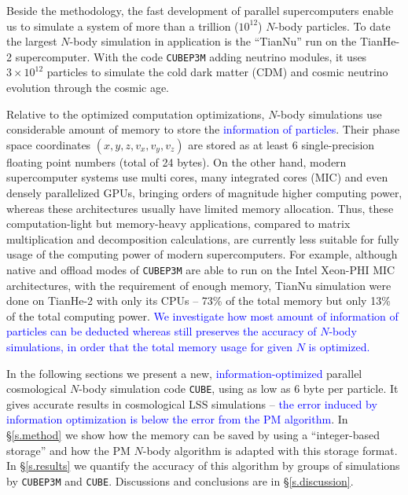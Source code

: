 \documentclass[10pt,twocolumn,preprint]{emulateapj}
\newcommand{\tcb}{\textcolor{blue}}
\begin{document}
Beside the methodology, the fast development of parallel supercomputers enable us to simulate a system of more than a trillion ($10^{12}$) $N$-body particles. To date the largest $N$-body simulation in application is the ``TianNu'' \citep{2017NatAs...1E.143Y,2017RAA....17...85E} run on the TianHe-2 supercomputer. With the code {\tt CUBEP3M} adding neutrino modules, it uses $3\times 10^{12}$ particles to simulate the cold dark matter (CDM) and cosmic neutrino evolution through the cosmic age.

Relative to the optimized computation optimizations, $N$-body simulations use considerable amount of memory to store the \tcb{information of particles}. Their phase space coordinates $(x,y,z,v_x,v_y,v_z)$ are stored as at least 6 single-precision floating point numbers (total of 24 bytes). On the other hand, modern supercomputer systems use multi cores, many integrated cores (MIC) and even densely parallelized GPUs, bringing orders of magnitude higher computing power, whereas these architectures usually have limited memory allocation. Thus, these computation-light but memory-heavy applications, compared to matrix multiplication and decomposition calculations, are currently less suitable for fully usage of the computing power of modern supercomputers. For example, although native and offload modes of {\tt CUBEP3M} are able to run on the Intel Xeon-PHI MIC architectures, with the requirement of enough memory, TianNu simulation were done on TianHe-2 with only its CPUs -- 73\% of the total memory but only 13\% of the total computing power. \tcb{We investigate how most amount of information of particles can be deducted whereas still preserves the accuracy of $N$-body simulations, in order that the total memory usage for given $N$ is optimized.}

In the following sections we present a new, \tcb{information-optimized} parallel cosmological $N$-body simulation code {\tt CUBE}, using as low as 6 byte per particle. It gives accurate results in cosmological LSS simulations -- \tcb{the error induced by information optimization is below the error from the PM algorithm}. In \S\ref{s.method} we show how the memory can be saved by using a ``integer-based storage'' and how the PM $N$-body algorithm is adapted with this storage format. In \S\ref{s.results} we quantify the accuracy of this algorithm by groups of simulations by {\tt CUBEP3M} and {\tt CUBE}. Discussions and conclusions are in \S\ref{s.discussion}.
\end{document}

